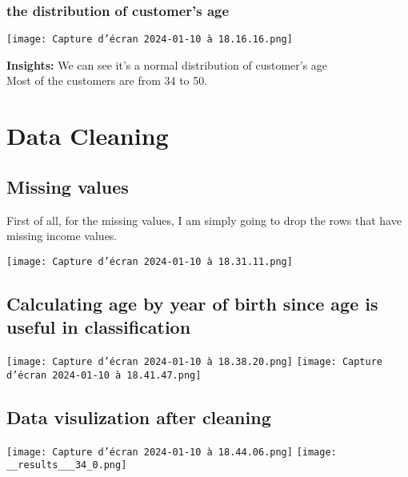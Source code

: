 \documentclass[12pt,a4paper]{report}
\begin{document}
\subsection{the distribution of customer's age}
\begin{center}
    \texttt{[image: Capture d’écran 2024-01-10 à 18.16.16.png]}
\end{center} 
\textbf{Insights:}
\vskip 0.2cm
We can see it's a normal distribution of customer's age\\
Most of the customers are from 34 to 50.














\chapter{Data Cleaning}
 \section{Missing values}
First of all, for the missing values, I am simply going to drop the rows that have missing income values.
\begin{center}
    \texttt{[image: Capture d’écran 2024-01-10 à 18.31.11.png]}
\end{center} 

\section{Calculating age by year of birth since age is useful in classification}
\begin{center}
    \texttt{[image: Capture d’écran 2024-01-10 à 18.38.20.png]}
    \texttt{[image: Capture d’écran 2024-01-10 à 18.41.47.png]}
\end{center} 

\section{Data visulization after cleaning}
\begin{center}
    \texttt{[image: Capture d’écran 2024-01-10 à 18.44.06.png]}
    \texttt{[image: \_\_results\_\_\_34\_0.png]}
   
\end{center} 
\end{document}
